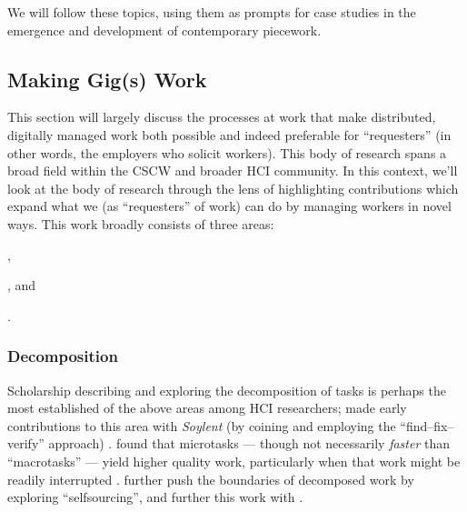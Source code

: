 \documentclass{sigchi}
\begin{document}
We will follow these topics, using them as prompts for case studies in
the emergence and
development of contemporary piecework.

\subsection{Making Gig(s) Work}\label{sec:MakingGigsWork}

This section will largely discuss the processes at work that make distributed,
digitally managed work both possible and indeed preferable for ``requesters''
(in other words, the employers who solicit workers).
This body of research spans a broad field
within the CSCW and broader HCI community.
In this context,
we'll look at the body of research through the lens of
highlighting contributions which expand what we
(as ``requesters'' of work) can do by managing workers in novel ways.
This work broadly consists of three areas:
\begin{inlinelist}
\item {},
\item {}, and
\item {}.
\end{inlinelist}


\subsubsection{Decomposition}\label{sec:decomposition}
Scholarship describing and exploring
the decomposition of tasks is perhaps the most established of the above areas among HCI researchers;
\citeauthor{bernsteinSoylent} made early contributions to this area with \textit{Soylent}
(by coining and employing the ``find--fix--verify'' approach)
\cite{bernsteinSoylent}.
\citeauthor{cheng2015break} found that microtasks
--- though not necessarily \textit{faster} than ``macrotasks'' ---
yield higher quality work,
particularly when that work might be readily interrupted
\cite{cheng2015break}.
\citeauthor{selfsourcingTeevan2014} further push the boundaries of decomposed work
by exploring ``selfsourcing'', and further this work with \citeauthor{selfsourcingTeevan2016}
\cite{selfsourcingTeevan2014,selfsourcingTeevan2016}.
\end{document}
